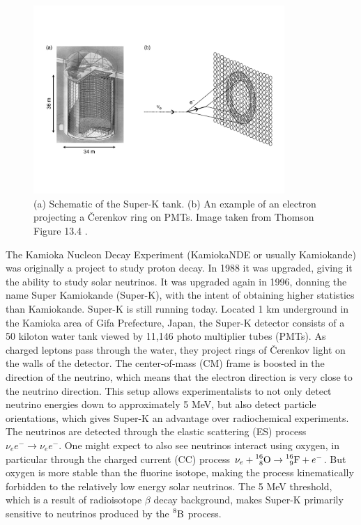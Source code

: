 \begin{figure}
  \centering
  \includegraphics[width=0.85\textwidth,height=0.85\textheight,keepaspectratio]
                {pictures/t13_4.pdf}
  \vspace*{-10mm}
  \caption{(a) Schematic of the Super-K tank. (b) An example of an electron
           projecting a \v{C}erenkov ring on PMTs. Image taken
           from Thomson Figure 13.4 \cite{thomson_modern_2013}.}
\end{figure}

The Kamioka Nucleon Decay Experiment (KamiokaNDE or usually Kamiokande) was
originally a project to study proton decay. In 1988 it was
upgraded, giving it the ability to study solar neutrinos. It was upgraded
again in 1996, donning the name Super Kamiokande (Super-K), with the intent
of obtaining higher statistics than Kamiokande. Super-K is still running today.
Located 1 km underground in the Kamioka area of Gifa Prefecture, Japan,
the Super-K detector consists of a 50 kiloton water tank viewed by 11,146
photo multiplier tubes (PMTs). As charged leptons pass through the water,
they project rings of \v{C}erenkov light on the walls of the detector. The
center-of-mass (CM)
frame is boosted in the direction of the neutrino, which means that the
electron direction is very close to the neutrino direction. This setup
allows experimentalists to not only detect neutrino energies down to
approximately 5 MeV, but also detect particle orientations, which gives Super-K
an advantage over radiochemical experiments.
The neutrinos are detected through the elastic scattering (ES) process
$\nu_ee^-\to\nu_ee^-$. One might expect to also see neutrinos interact
using oxygen, in particular through the charged current (CC) process
$\nu_e+\prescript{16}{8}{\text{O}}\to\prescript{16}{9}{\text{F}}+e^-$.
But oxygen is more stable than the fluorine isotope, making the process
kinematically forbidden to the relatively low energy solar neutrinos. The 5
MeV threshold, which is a result of radioisotope $\beta$ decay background,
 makes Super-K primarily sensitive to neutrinos produced by
the $\prescript{8}{}{\text{B}}$ process.

